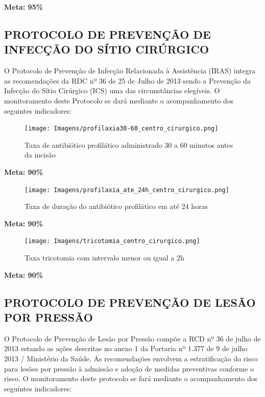 \documentclass[
  a4paper]{article}
\begin{document}
\begin{center}
 \textbf{Meta: 95\%}
\end{center}

\subsection{PROTOCOLO DE PREVENÇÃO DE INFECÇÃO DO SÍTIO CIRÚRGICO}

\hspace{1cm} O Protocolo de Prevenção de Infecção Relacionada à
Assistência (IRAS) integra as recomendações da RDC nº 36 de 25 de Julho
de 2013 sendo a Prevenção da Infecção do Sítio Cirúrgico (ICS) uma das
circunstâncias elegíveis. O monitoramento deste Protocolo se dará
mediante o acompanhamento dos seguintes indicadores:

\begin{figure}[H]
\caption{Taxa de antibiótico profilático administrado 30 a 60 minutos antes da incisão}
\texttt{[image: Imagens/profilaxia30-60\_centro\_cirurgico.png]}
\end{figure}

\begin{center}
 \textbf{Meta: 90\%}
\end{center}

\begin{figure}[H]
\caption{Taxa de duração do antibiótico profilático em até 24 horas}
\texttt{[image: Imagens/profilaxia\_ate\_24h\_centro\_cirurgico.png]}
\end{figure}

\begin{center}
 \textbf{Meta: 90\%}
\end{center}

\begin{figure}[H]
\caption{Taxa tricotomia com intervalo menor ou igual a 2h}
\texttt{[image: Imagens/tricotomia\_centro\_cirurgico.png]}
\end{figure}

\begin{center}
 \textbf{Meta: 90\%}
\end{center}

\newpage

\subsection{PROTOCOLO DE PREVENÇÃO DE LESÃO POR PRESSÃO}

\hspace{1cm} O Protocolo de Prevenção de Lesão por Pressão compõe a RCD
nº 36 de julho de 2013 estando as ações descritas no anexo 1 da Portaria
nº 1.377 de 9 de julho 2013 / Ministério da Saúde. As recomendações
envolvem a estratificação do risco para lesões por pressão à admissão e
adoção de medidas preventivas conforme o risco. O monitoramento deste
protocolo se fará mediante o acompanhamento dos seguintes indicadores:
\end{document}
